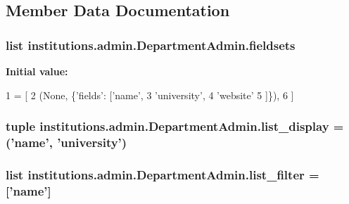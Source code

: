 \subsection{Member Data Documentation}
\hypertarget{classinstitutions_1_1admin_1_1_department_admin_a1d6b1412fe76305e156453dd0b6cffc6}{
\subsubsection[{fieldsets}]{\setlength{\rightskip}{0pt plus 5cm}list institutions.\-admin.\-Department\-Admin.\-fieldsets\hspace{0.3cm}{\ttfamily [static]}}}\label{classinstitutions_1_1admin_1_1_department_admin_a1d6b1412fe76305e156453dd0b6cffc6}
{\bfseries Initial value\-:}
\begin{DoxyCode}
1 = [
2         (\textcolor{keywordtype}{None}, \{\textcolor{stringliteral}{'fields'}: [\textcolor{stringliteral}{'name'},
3                            \textcolor{stringliteral}{'university'},
4                            \textcolor{stringliteral}{'website'}
5         ]\}),
6     ]
\end{DoxyCode}
\hypertarget{classinstitutions_1_1admin_1_1_department_admin_aabdec6672d05ba88874cb9b1b371cb78}{
\subsubsection[{list\-\_\-display}]{\setlength{\rightskip}{0pt plus 5cm}tuple institutions.\-admin.\-Department\-Admin.\-list\-\_\-display = ('name', 'university')\hspace{0.3cm}{\ttfamily [static]}}}\label{classinstitutions_1_1admin_1_1_department_admin_aabdec6672d05ba88874cb9b1b371cb78}
\hypertarget{classinstitutions_1_1admin_1_1_department_admin_a6acc9d177a0a2f8da5240f83428dfc73}{
\subsubsection[{list\-\_\-filter}]{\setlength{\rightskip}{0pt plus 5cm}list institutions.\-admin.\-Department\-Admin.\-list\-\_\-filter = \mbox{[}'name'\mbox{]}\hspace{0.3cm}{\ttfamily [static]}}}\label{classinstitutions_1_1admin_1_1_department_admin_a6acc9d177a0a2f8da5240f83428dfc73}
